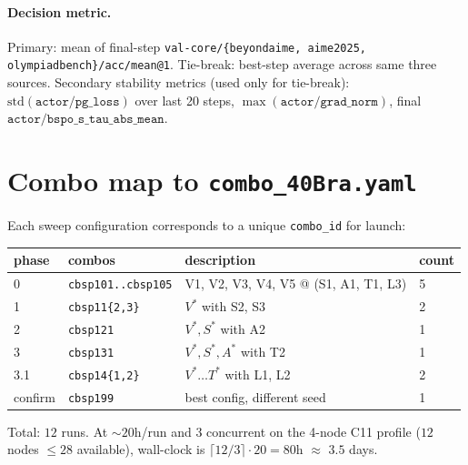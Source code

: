 \documentclass[11pt]{article}
\begin{document}
\paragraph{Decision metric.}
Primary: mean of final-step
\verb|val-core/{beyondaime, aime2025, olympiadbench}/acc/mean@1|.
Tie-break: best-step average across same three sources. Secondary
stability metrics (used only for tie-break):
$\mathrm{std}(\texttt{actor/pg\_loss})$ over last 20 steps,
$\max(\texttt{actor/grad\_norm})$, final
$\texttt{actor/bspo\_s\_tau\_abs\_mean}$.

\section{Combo map to \texttt{combo\_40Bra.yaml}}

Each sweep configuration corresponds to a unique \verb|combo_id| for
launch:

\begin{center}
\renewcommand{\arraystretch}{1.2}
\begin{tabular}{l l l l}
\toprule
phase & combos & description & count \\
\midrule
0   & \verb|cbsp101..cbsp105| & V1, V2, V3, V4, V5 @ (S1, A1, T1, L3) & 5 \\
1   & \verb|cbsp11{2,3}| & $V^\ast$ with S2, S3 & 2 \\
2   & \verb|cbsp121|     & $V^\ast, S^\ast$ with A2 & 1 \\
3   & \verb|cbsp131|     & $V^\ast, S^\ast, A^\ast$ with T2 & 1 \\
3.1 & \verb|cbsp14{1,2}| & $V^\ast\ldots T^\ast$ with L1, L2 & 2 \\
confirm & \verb|cbsp199| & best config, different seed & 1 \\
\bottomrule
\end{tabular}
\end{center}

Total: $12$ runs. At $\sim 20$h/run and $3$ concurrent on the 4-node C11
profile ($12$ nodes $\leq 28$ available), wall-clock is
$\lceil 12/3\rceil\cdot 20 = 80$h $\approx$ $3.5$ days.
\end{document}
